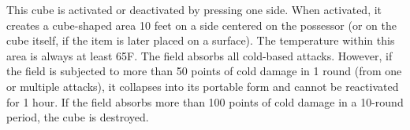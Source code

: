 {

\begin{comment}
Cube of Force:} This device is about 3/4 inch across and can be made of ivory, bone, or any hard mineral. It enables its possessor to put up a special wall of force 10 feet on a side around her person. This cubic screen moves with the character and is impervious to the attack forms mentioned on the table below. The cube has 36 charges, which are renewed each day. The possessor presses one face of the cube to activate a particular type of screen or to deactivate the device. Each effect costs a certain number of charges to maintain for every minute (or portion of a minute) it is in operation. Also, when an effect is active, the possessor's speed is limited to the maximum value given on the table.

When the cube of force is active, attacks dealing more than 30 points of damage drain 1 charge for every 10 points of damage beyond 30 that they deal. Spells that affect the integrity of the screen also drain extra charges. These spells (given in the list below) cannot be cast into or out of the cube:

Cube Face & Charge Cost per Minute & Maximum Speed & Effect \\
1 & 1 & 30 ft. & Keeps out gases, wind, etc. \\
2 & 2 & 20 ft. & Keeps out nonliving matter \\
3 & 3 & 15 ft. & Keeps out living matter \\
4 & 4 & 10 ft. & Keeps out magic \\
5 & 6 & 10 ft. & Keeps out all things \\
6 & 0 & As normal & Deactivates &

Attack Form & Extra Charges \\
Horn of blasting & 6 \\
Wall of fire & 2 \\
Passwall & 3 \\
Disintegrate & 6 \\
Phase door & 5 \\
Prismatic spray & 7 &

Moderate evocation; CL 10th; Craft Wondrous Item, wall of force; Price 62,000 gp.
\end{comment}

 This cube is activated or deactivated by pressing one side. When activated, it creates a cube-shaped area 10 feet on a side centered on the possessor (or on the cube itself, if the item is later placed on a surface). The temperature within this area is always at least 65\degree F. The field absorbs all cold-based attacks. However, if the field is subjected to more than 50 points of cold damage in 1 round (from one or multiple attacks), it collapses into its portable form and cannot be reactivated for 1 hour. If the field absorbs more than 100 points of cold damage in a 10-round period, the cube is destroyed.

}
